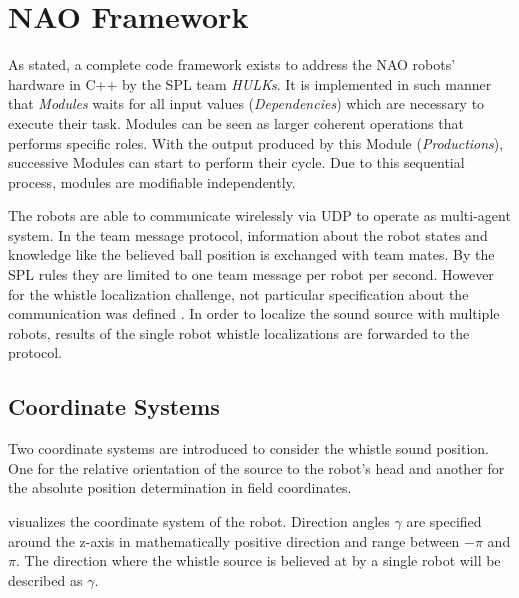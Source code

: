 \section{NAO Framework}
\label{sec:03_naoFramework}

As stated, a complete code framework exists to address the NAO robots' hardware
in C++ by the \ac{SPL} team \textit{HULKs}.
It is implemented in such manner that \textit{Modules} waits for all input
values (\textit{Dependencies}) which are necessary to execute their task.
Modules can be seen as larger coherent operations that performs specific roles.
With the output produced by this Module (\textit{Productions}), successive
Modules can start to perform their cycle.
Due to this sequential process, modules are modifiable independently.

The robots are able to communicate wirelessly via \ac{UDP} to operate as
multi-agent system.
In the team message protocol, information about the robot states and
knowledge like the believed ball position is exchanged with team mates.
By the \ac{SPL} rules \cite{rules} they are limited to one team message per
robot per second.
However for the whistle localization challenge, not particular specification
about the communication was defined \cite{technical_challenge}.
In order to localize the sound source with multiple robots, results of the
single robot whistle localizations are forwarded to the protocol.

\subsection{Coordinate Systems}
\label{subsec:03_coordinates}

Two coordinate systems are introduced to consider the whistle sound position.
One for the relative orientation of the source to the robot's head and another
for the absolute position determination in field coordinates.

 visualizes the coordinate system of the
robot.
Direction angles $\gamma$ are specified around the z-axis in
mathematically positive direction and range between $-\pi$ and $\pi$.
The direction where the whistle source is believed at by a single robot
will be described as $\gamma$.

